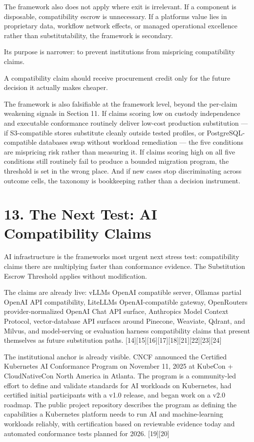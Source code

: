 \documentclass[11pt]{article}
\begin{document}
The framework also does not apply where exit is irrelevant. If a component is disposable, compatibility escrow is unnecessary. If a platform\textquotesingle s value lies in proprietary data, workflow network effects, or managed operational excellence rather than substitutability, the framework is secondary.

Its purpose is narrower: to prevent institutions from mispricing compatibility claims.

A compatibility claim should receive procurement credit only for the future decision it actually makes cheaper.

The framework is also falsifiable at the framework level, beyond the per-claim weakening signals in Section 11. If claims scoring low on custody independence and executable conformance routinely deliver low-cost production substitution --- if S3-compatible stores substitute cleanly outside tested profiles, or PostgreSQL-compatible databases swap without workload remediation --- the five conditions are mispricing risk rather than measuring it. If claims scoring high on all five conditions still routinely fail to produce a bounded migration program, the threshold is set in the wrong place. And if new cases stop discriminating across outcome cells, the taxonomy is bookkeeping rather than a decision instrument.

\section{13. The Next Test: AI Compatibility Claims}\label{the-next-test-ai-compatibility-claims}

AI infrastructure is the framework\textquotesingle s most urgent next stress test: compatibility claims there are multiplying faster than conformance evidence. The Substitution Escrow Threshold applies without modification.

The claims are already live: vLLM\textquotesingle s OpenAI compatible server, Ollama\textquotesingle s partial OpenAI API compatibility, LiteLLM\textquotesingle s OpenAI-compatible gateway, OpenRouter\textquotesingle s provider-normalized OpenAI Chat API surface, Anthropic\textquotesingle s Model Context Protocol, vector-database API surfaces around Pinecone, Weaviate, Qdrant, and Milvus, and model-serving or evaluation harness compatibility claims that present themselves as future substitution paths. {[}14{]}{[}15{]}{[}16{]}{[}17{]}{[}18{]}{[}21{]}{[}22{]}{[}23{]}{[}24{]}

The institutional anchor is already visible. CNCF announced the Certified Kubernetes AI Conformance Program on November 11, 2025 at KubeCon + CloudNativeCon North America in Atlanta. The program is a community-led effort to define and validate standards for AI workloads on Kubernetes, had certified initial participants with a v1.0 release, and began work on a v2.0 roadmap. The public project repository describes the program as defining the capabilities a Kubernetes platform needs to run AI and machine-learning workloads reliably, with certification based on reviewable evidence today and automated conformance tests planned for 2026. {[}19{]}{[}20{]}
\end{document}
